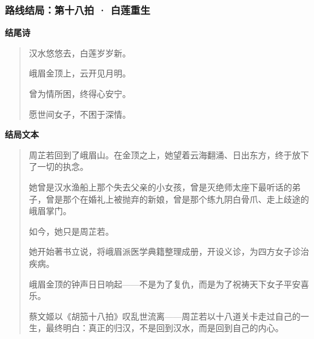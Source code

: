 \clearpage
\subsubsection{路线结局：第十八拍 · 白莲重生}
\textbf{结尾诗}\begin{quote}汉水悠悠去，白莲岁岁新。\par 峨眉金顶上，云开见月明。\par 曾为情所困，终得心安宁。\par 愿世间女子，不困于深情。\end{quote}
\textbf{结局文本}\begin{quote}周芷若回到了峨眉山。在金顶之上，她望着云海翻涌、日出东方，终于放下了一切的执念。\par \par 她曾是汉水渔船上那个失去父亲的小女孩，曾是灭绝师太座下最听话的弟子，曾是那个在婚礼上被抛弃的新娘，曾是那个练九阴白骨爪、走上歧途的峨眉掌门。\par \par 如今，她只是周芷若。\par \par 她开始著书立说，将峨眉派医学典籍整理成册，开设义诊，为四方女子诊治疾病。\par \par 峨眉金顶的钟声日日响起——不是为了复仇，而是为了祝祷天下女子平安喜乐。\par \par 蔡文姬以《胡笳十八拍》叹乱世流离——周芷若以十八道关卡走过自己的一生，最终明白：真正的归汉，不是回到汉水，而是回到自己的内心。\end{quote}
